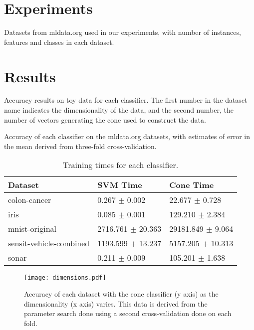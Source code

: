\documentclass{article}
\begin{document}
\section{Experiments}

\begin{table}
\begin{center}
\end{center}
\caption{Datasets from mldata.org used in our experiments, with number
  of instances, features and classes in each dataset.}
\end{table}

\section{Results}

\begin{table*}
\begin{center}
\end{center}
\caption{Accuracy results on toy data for each classifier. The first
  number in the dataset name indicates the dimensionality of the data,
  and the second number, the number of vectors generating the cone used
  to construct the data.}
\end{table*}

\begin{table*}
\begin{center}
\end{center}
\caption{Accuracy of each classifier on the mldata.org datasets, with
  estimates of error in the mean derived from three-fold
  cross-validation.}
\end{table*}


\begin{table*}
\begin{center}
\begin{tabular}{|l|l|l|}
\hline
Dataset & SVM Time & Cone Time\\
\hline
colon-cancer & 0.267 $\pm$ 0.002 & 22.677 $\pm$ 0.728\\
iris & 0.085 $\pm$ 0.001 & 129.210 $\pm$ 2.384\\
mnist-original & 2716.761 $\pm$ 20.363 & 29181.849 $\pm$ 9.064\\
sensit-vehicle-combined & 1193.599 $\pm$ 13.237 & 5157.205 $\pm$ 10.313\\
sonar & 0.211 $\pm$ 0.009 & 105.201 $\pm$ 1.638\\
\hline
\end{tabular}
\end{center}
\caption{Training times for each classifier.}
\end{table*}


\begin{figure}
\begin{center}
\texttt{[image: dimensions.pdf]}
\end{center}
\caption{Accuracy of each dataset with the cone classifier (y axis) as
  the dimensionality (x axis) varies. This data is derived from the
  parameter search done using a second cross-validation done on each
  fold.}
\end{figure}
\end{document}
